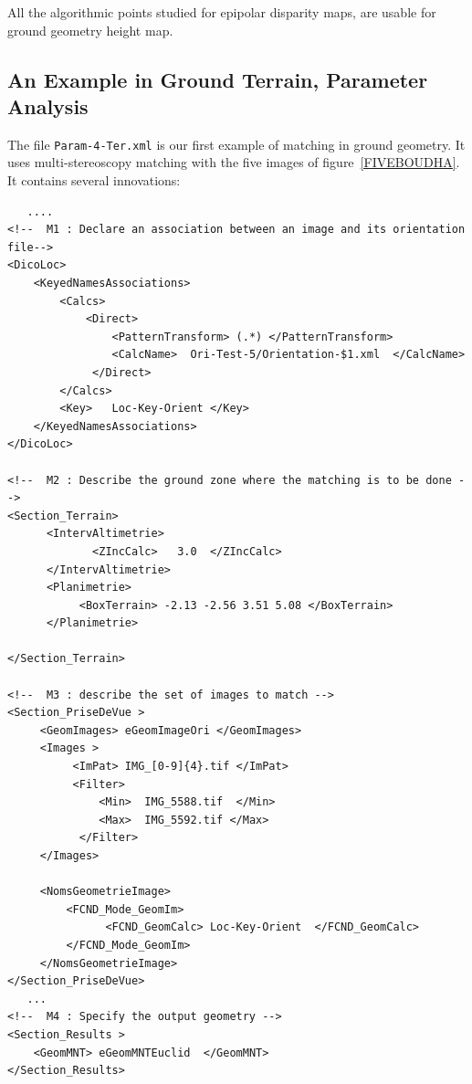 All the algorithmic points studied for epipolar disparity maps, are usable for
ground geometry height map.


\subsection{An Example in Ground Terrain, Parameter Analysis}


\label{FIRSTASSOC:LOC}
The file {\tt Param-4-Ter.xml} is our first example of matching in ground geometry.
It uses multi-stereoscopy matching with the five images of figure~\ref{FIVEBOUDHA}.
It contains several innovations:

{\scriptsize
\begin{verbatim}
   ....
<!--  M1 : Declare an association between an image and its orientation file-->
<DicoLoc>
    <KeyedNamesAssociations>
        <Calcs>
            <Direct>
                <PatternTransform> (.*) </PatternTransform>
                <CalcName>  Ori-Test-5/Orientation-$1.xml  </CalcName>
             </Direct>
        </Calcs>
        <Key>   Loc-Key-Orient </Key>
    </KeyedNamesAssociations>
</DicoLoc>

<!--  M2 : Describe the ground zone where the matching is to be done -->
<Section_Terrain>
      <IntervAltimetrie>
             <ZIncCalc>   3.0  </ZIncCalc>
      </IntervAltimetrie>
      <Planimetrie>
           <BoxTerrain> -2.13 -2.56 3.51 5.08 </BoxTerrain>
      </Planimetrie>

</Section_Terrain>

<!--  M3 : describe the set of images to match -->
<Section_PriseDeVue >
     <GeomImages> eGeomImageOri </GeomImages>
     <Images >
          <ImPat> IMG_[0-9]{4}.tif </ImPat>
          <Filter>
              <Min>  IMG_5588.tif  </Min>
              <Max>  IMG_5592.tif </Max>
           </Filter>
     </Images>

     <NomsGeometrieImage>
         <FCND_Mode_GeomIm>
               <FCND_GeomCalc> Loc-Key-Orient  </FCND_GeomCalc>
         </FCND_Mode_GeomIm>
     </NomsGeometrieImage>
</Section_PriseDeVue>
   ...
<!--  M4 : Specify the output geometry -->
<Section_Results >
    <GeomMNT> eGeomMNTEuclid  </GeomMNT>
</Section_Results>

\end{verbatim}
}

